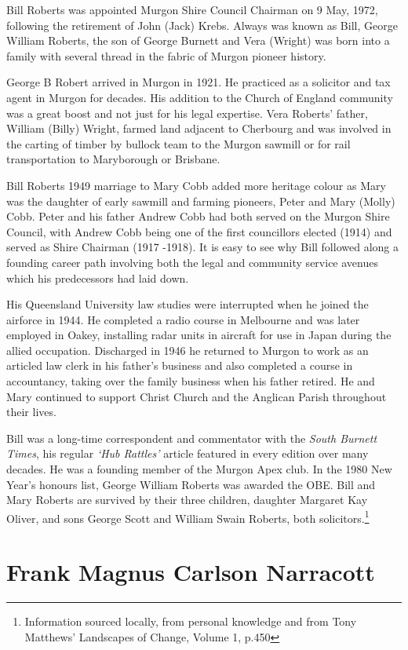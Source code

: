 Bill Roberts was appointed Murgon Shire Council Chairman on 9 May, 1972, following the retirement of John (Jack) Krebs. Always was known as Bill, George William Roberts, the son of George Burnett and Vera (Wright) was born into a family with several thread in the fabric of Murgon pioneer history.

George B Robert arrived in Murgon in 1921. He practiced as a solicitor and tax agent in Murgon for decades. His addition to the Church of England community was a great boost and not just for his legal expertise. Vera Roberts' father, William (Billy) Wright, farmed land adjacent to Cherbourg and was involved in the carting of timber by bullock team to the Murgon sawmill or for rail transportation to Maryborough or Brisbane.

Bill Roberts 1949 marriage to Mary Cobb added more heritage colour as Mary was the daughter of early sawmill and farming pioneers, Peter and Mary (Molly) Cobb. Peter and his father Andrew Cobb had both served on the Murgon Shire Council, with Andrew Cobb being one of the first councillors elected (1914) and served as Shire Chairman (1917 -1918). It is easy to see why Bill followed along a founding career path involving both the legal and community service avenues which his predecessors had laid down.

His Queensland University law studies were interrupted when he joined the airforce in 1944. He completed a radio course in Melbourne and was later employed in Oakey, installing radar units in aircraft for use in Japan during the allied occupation. Discharged in 1946 he returned to Murgon to work as an articled law clerk in his father's business and also completed a course in accountancy, taking over the family business when his father retired. He and Mary continued to support Christ Church and the Anglican Parish throughout their lives.

Bill was a long-time correspondent and commentator with the \emph{South Burnett Times}, his regular \emph{`Hub Rattles'} article featured in every edition over many decades. He was a founding member of the Murgon Apex club. In the 1980 New Year's honours list, George William Roberts was awarded the OBE. Bill and Mary Roberts are survived by their three children, daughter Margaret Kay Oliver, and sons George Scott and William Swain Roberts, both solicitors.\footnote{Information sourced locally, from personal knowledge and from Tony Matthews' Landscapes of Change, Volume 1, p.450}

\hypertarget{frank-magnus-carlson-narracott}{%
\section{Frank Magnus Carlson Narracott}\label{frank-magnus-carlson-narracott}}

